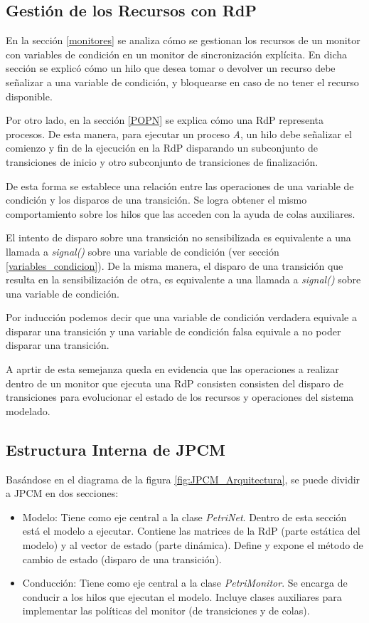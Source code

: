 \subsection{Gestión de los Recursos con RdP}
\label{JPCM_gestion_rec_rdp}
En la sección \ref{monitores} se analiza cómo se gestionan los recursos de un
monitor con variables de condición en un monitor de sincronización explícita.
En dicha sección se explicó cómo un hilo que desea tomar o devolver un recurso
debe señalizar a una variable de condición, y bloquearse en caso de no tener el
recurso disponible.

Por otro lado, en la sección \ref{POPN} se explica cómo una RdP representa
procesos. De esta manera, para ejecutar un proceso \textit{A}, un hilo debe
señalizar el comienzo y fin de la ejecución en la RdP disparando un subconjunto
de transiciones de inicio y otro subconjunto de transiciones de finalización.
 
De esta forma se establece una relación entre las operaciones de una variable de
condición y los disparos de una transición. Se logra obtener el mismo
comportamiento sobre los hilos que las acceden con la ayuda de colas auxiliares. 

El intento de disparo sobre una transición no sensibilizada es equivalente a una
llamada a \textit{signal()} sobre una variable de condición (ver sección
\ref{variables_condicion}).
De la misma manera, el disparo de una transición que resulta en la
sensibilización de otra, es equivalente a una llamada a \textit{signal()} sobre
una variable de condición.

Por inducción podemos decir que una variable de condición verdadera equivale a
disparar una transición y una variable de condición falsa equivale a no poder
disparar una transición.

A aprtir de esta semejanza queda en evidencia que las operaciones a realizar
dentro de un monitor que ejecuta una RdP consisten consisten del disparo de
transiciones para evolucionar el estado de los recursos y operaciones del
sistema modelado.

\subsection{Estructura Interna de JPCM}
Basándose en el diagrama de la figura \ref{fig:JPCM_Arquitectura}, se puede
dividir a JPCM en dos secciones:
\begin{itemize}
    \item Modelo: Tiene como eje central a la clase \textit{PetriNet}.
    Dentro de esta sección está el modelo a ejecutar. Contiene las matrices de
    la RdP (parte estática del modelo) y al vector de estado (parte dinámica).
    Define y expone el método de cambio de estado (disparo de una transición).
    \item Conducción: Tiene como eje central a la clase \textit{PetriMonitor}.
    Se encarga de conducir a los hilos que ejecutan el modelo.
    Incluye clases auxiliares para implementar las políticas del monitor (de
    transiciones y de colas).
\end{itemize}

